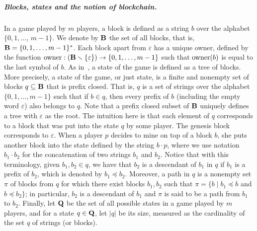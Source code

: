 \subparagraph*{Blocks, states and the notion of blockchain.}%
In a game played by $m$ players, a block is defined as a string $b$ over the alphabet $\{0,1,\ldots$, $m-1\}$. We denote by $\mathbf{B}$ the set of all blocks, that is, $\mathbf{B} = \{0,1,\ldots , m-1\}^*$. Each block apart from $\varepsilon$ has a unique owner, defined by the function $\text{\rm owner}: (\mathbf{B} \smallsetminus \{\varepsilon\}) \rightarrow \{0,1, \ldots ,m-1\}$ such that $\text{\rm owner}(b)$ is equal to the last symbol of $b$. As in~\cite{mininggames:2016}, a state of the game is defined as a tree of blocks. More precisely, a state of the game, or just state, is a finite and nonempty set of blocks $q \subseteq \mathbf{B}$ that is prefix closed. That is, $q$ is a set of strings over the alphabet $\{0,1,\ldots, m-1\}$ such that if $b\in q$, then every prefix of $b$ (including the empty word $\varepsilon$) also belongs to $q$. Note that a prefix closed subset of $\mathbf{B}$ uniquely defines a tree with $\varepsilon$ as the root.
%
The intuition here is that each element of $q$ corresponds to a block that was put into the state $q$ by some player. The genesis block corresponds to $\varepsilon$. When a player $p$ decides to mine on top of a block $b$, she puts another block into the state defined by the string $b\cdot p$, where we use notation $b_1 \cdot b_2$ for the concatenation of two strings $b_1$ and $b_2$.
%
Notice that with this terminology, given $b_1, b_2 \in q$, we have that $b_2$ is a descendant of $b_1$ in $q$ if $b_1$ is a prefix of $b_2$, which is denoted by $b_1 \preceq b_2$. Moreover, a path in $q$ is a nonempty set $\pi$ of blocks from $q$ for which there exist blocks $b_1, b_2$ such that $\pi = \{ b \mid b_1 \preceq b$ and $b \preceq b_2\}$; in particular, $b_2$ is a descendant of $b_1$ and $\pi$ is said to be a path from $b_1$ to $b_2$.
Finally, let $\mathbf{Q}$ be the set of all possible states in a game played by $m$ players, and for a state $q \in \mathbf{Q}$, let $|q|$ be its size, measured as the cardinality of the set $q$ of strings (or blocks).

